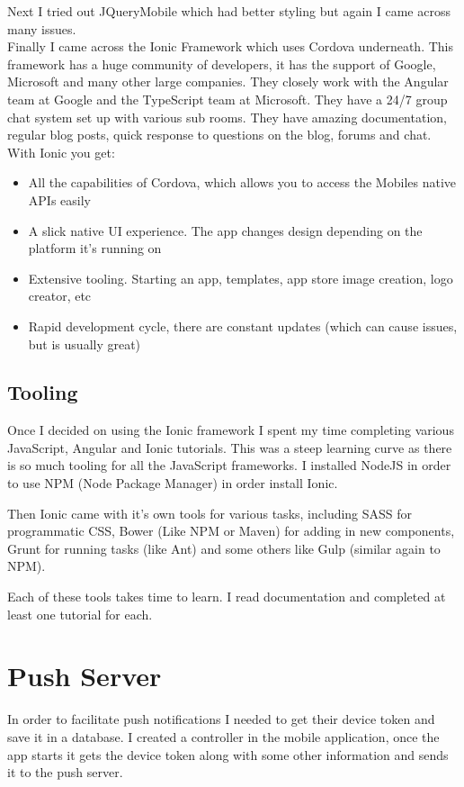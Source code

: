 Next I tried out JQueryMobile \cite{jquery_mobile} which had better styling but again I came across many issues.
\\

Finally I came across the Ionic Framework \cite{ionic} which uses Cordova underneath. This framework has a huge community of developers, it has the support of Google, Microsoft and many other large companies. They closely work with the Angular team at Google and the TypeScript team at Microsoft. 
They have a 24/7 group chat system set up with various sub rooms. 
They have amazing documentation, regular blog posts, quick response to questions on the blog, forums and chat. 
With Ionic you get:
\begin{itemize}
\item All the capabilities of Cordova, which allows you to access the Mobiles native APIs easily
\item A slick native UI experience. The app changes design depending on the platform it's running on
\item Extensive tooling. Starting an app, templates, app store image creation, logo creator, etc
\item Rapid development cycle, there are constant updates (which can cause issues, but is usually great)
\end{itemize}

\subsection{Tooling}
Once I decided on using the Ionic framework I spent my time completing various JavaScript, Angular and Ionic tutorials. This was a steep learning curve as there is so much tooling for all the JavaScript frameworks.
I installed NodeJS in order to use NPM (Node Package Manager) in order install Ionic. 

Then Ionic came with it's own tools for various tasks, including SASS for programmatic CSS, Bower (Like NPM or Maven) for adding in new components, Grunt for running tasks (like Ant) and some others like Gulp (similar again to NPM).

Each of these tools takes time to learn. I read documentation and completed at least one tutorial for each.

\section{Push Server}
In order to facilitate push notifications I needed to get their device token and save it in a database.
I created a controller in the mobile application, once the app starts it gets the device token along with some other information and sends it to the push server.


